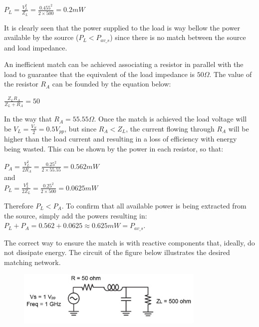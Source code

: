 \begin{center}
    $P_L = \frac{V_L^2}{Z_L} = \frac{0.455^2}{2 \times 500} = 0.2 mW$
\end{center}

It is clearly seen that the power supplied to the load is way bellow the power available by the source ($P_L < P_{av\_s}$) since there is no match between the source and load impedance. 

An inefficient match can be achieved associating a resistor in parallel with the load to guarantee that the equivalent of the load impedance is $50 \Omega$. The value of the resistor $R_A$ can be founded by the equation below: 

\begin{center}
    $\frac{Z_L R_A}{Z_L+R_A} = 50$
\end{center}

In the way that $R_A = 55.55 \Omega$. Once the match is achieved the load voltage will be $V_L = \frac{V_S}{2} = 0.5 V_{pp}$, but since $R_A<Z_L$, the current flowing through $R_A$ will be higher than the load current and resulting in a loss of efficiency with energy being wasted. This can be shown by the power in each resistor, so that:

\begin{center}
    $P_A = \frac{V_L^2}{2 R_A} = \frac{0.25^2}{2 \times 55.55} = 0.562 mW$ \\ \vspace{10pt}
    and \\ \vspace{10pt}
    $P_L = \frac{V_L^2}{2 Z_L} = \frac{0.25^2}{2 \times 500} = 0.0625 mW$
\end{center} 

Therefore $P_L<P_A$. To confirm that all available power is being extracted from the source, simply add the powers resulting in: $P_L + P_A = 0.562 + 0.0625 \approx 0.625 mW = P_{av\_s}$.

The correct way to ensure the match is with reactive components that, ideally, do not dissipate energy. The circuit of the figure below illustrates the desired matching network.

\begin{figure}[H] 
\centering
\includegraphics[width=9cm]{images/ckt3p2.png}
\end{figure}

